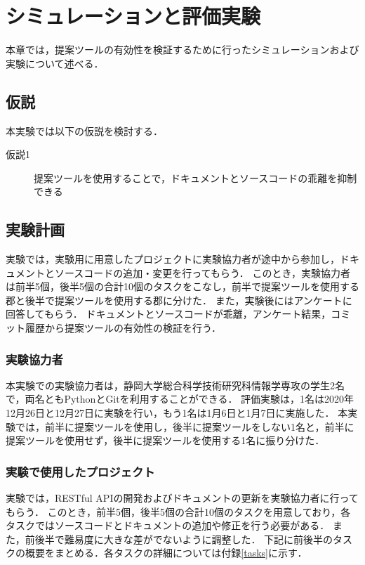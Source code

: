 \chapter{シミュレーションと評価実験}
本章では，提案ツールの有効性を検証するために行ったシミュレーションおよび実験について述べる．

\section{仮説}
本実験では以下の仮説を検討する．

\begin{description}
    \item[仮説1] 提案ツールを使用することで，ドキュメントとソースコードの乖離を抑制できる
\end{description}

\section{実験計画}
\label{plan}
実験では，実験用に用意したプロジェクトに実験協力者が途中から参加し，ドキュメントとソースコードの追加・変更を行ってもらう．
このとき，実験協力者は前半5個，後半5個の合計10個のタスクをこなし，前半で提案ツールを使用する郡と後半で提案ツールを使用する郡に分けた．
また，実験後にはアンケートに回答してもらう．
ドキュメントとソースコードが乖離，アンケート結果，コミット履歴から提案ツールの有効性の検証を行う．

\subsection{実験協力者}
本実験での実験協力者は，静岡大学総合科学技術研究科情報学専攻の学生2名で，両名ともPythonとGitを利用することができる．
評価実験は，1名は2020年12月26日と12月27日に実験を行い，もう1名は1月6日と1月7日に実施した．
本実験では，前半に提案ツールを使用し，後半に提案ツールをしない1名と，前半に提案ツールを使用せず，後半に提案ツールを使用する1名に振り分けた．

\subsection{実験で使用したプロジェクト}
実験では，RESTful APIの開発およびドキュメントの更新を実験協力者に行ってもらう．
このとき，前半5個，後半5個の合計10個のタスクを用意しており，各タスクではソースコードとドキュメントの追加や修正を行う必要がある．
また，前後半で難易度に大きな差がでないように調整した．
下記に前後半のタスクの概要をまとめる．各タスクの詳細については付録\ref{tasks}に示す．

